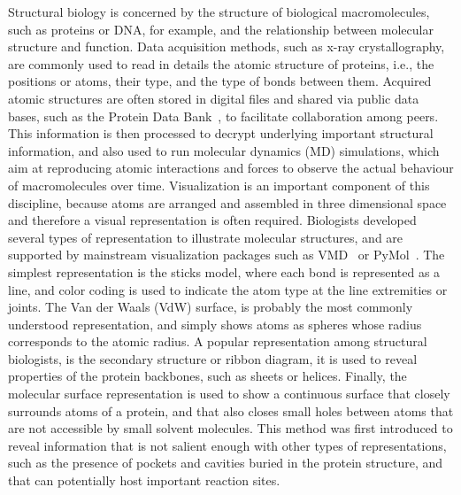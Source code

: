 Structural biology is concerned by the structure of biological macromolecules, such as proteins or DNA, for example, and the relationship between molecular structure and function.
Data acquisition methods, such as x-ray crystallography, are commonly used to read in details the atomic structure of proteins, i.e., the positions or atoms, their type, and the type of bonds between them.
Acquired atomic structures are often stored in digital files and shared via public data bases, such as the Protein Data Bank~\cite{bernstein1977protein}, to facilitate collaboration among peers.
This information is then processed to decrypt underlying important structural information, and also used to run molecular dynamics (MD) simulations, which aim at reproducing atomic interactions and forces to observe the actual behaviour of macromolecules over time.
Visualization is an important component of this discipline, because atoms are arranged and assembled in three dimensional space and therefore a visual representation is often required.
Biologists developed several types of representation to illustrate molecular structures, and are supported by mainstream visualization packages such as VMD~\cite{humphrey1996vmd} or PyMol~\cite{PyMOL}.
The simplest representation is the sticks model, where each bond is represented as a line, and color coding is used to indicate the atom type at the line extremities or joints.
The Van der Waals (VdW) surface, is probably the most commonly understood representation, and simply shows atoms as spheres whose radius corresponds to the atomic radius.
A popular representation among structural biologists, is the secondary structure or ribbon diagram, it is used to reveal properties of the protein backbones, such as sheets or helices.
Finally, the molecular surface representation is used to show a continuous surface that closely surrounds atoms of a protein, and that also closes small holes between atoms that are not accessible by small solvent molecules.
This method was first introduced to reveal information that is not salient enough with other types of representations, such as the presence of pockets and cavities buried in the protein structure, and that can potentially host important reaction sites.

